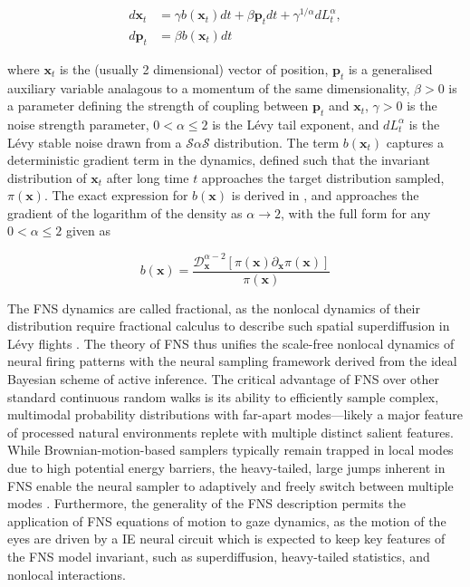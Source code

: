 \begin{equation}
\label{eq:fns}
\begin{aligned}
	d\textbf{x}_t &= \gamma b(\textbf{x}_t)dt + \beta \textbf{p}_t dt + \gamma^{1/\alpha} dL_t^{\alpha}, \\
	d\textbf{p}_t &= \beta b(\textbf{x}_t) dt
\end{aligned}
\end{equation}

where $\textbf{x}_t$ is the (usually 2 dimensional) vector of position, $\textbf{p}_t$ is a generalised auxiliary variable analagous to a momentum of the same dimensionality, $\beta > 0$ is a parameter defining the strength of coupling between $\textbf{p}_t$ and $\textbf{x}_t$, $\gamma > 0$ is the noise strength parameter, $ 0 < \alpha \leq 2$ is the Lévy tail exponent, and $dL_t^{\alpha}$ is the Lévy stable noise drawn from a $\mathcal{S}\alpha\mathcal{S}$ distribution. The term $b(\textbf{x}_t)$ captures a deterministic gradient term in the dynamics, defined such that the invariant distribution of $\textbf{x}_t$ after long time $t$ approaches the target distribution sampled, $\pi(\textbf{x})$. The exact expression for $b(\textbf{x})$ is derived in \cite{qi_fractional_2022}, and approaches the gradient of the logarithm of the density as $\alpha \rightarrow 2$, with the full form for any $ 0 < \alpha \leq 2$ given as

\begin{equation}
	b(\textbf{x}) = \frac{\mathcal{D}^{\alpha - 2}_{\textbf{x}}[\pi(\textbf{x}) \partial_{\textbf{x}} \pi(\textbf{x})]}{\pi(\textbf{x})}
\end{equation}

The FNS dynamics are called fractional, as the nonlocal dynamics of their distribution require fractional calculus to describe such spatial superdiffusion in Lévy flights \cite{tarasov_general_2021}. The theory of FNS thus unifies the scale-free nonlocal dynamics of neural firing patterns with the neural sampling framework derived from the ideal Bayesian scheme of active inference. The critical advantage of FNS over other standard continuous random walks is its ability to efficiently sample complex, multimodal probability distributions with far-apart modes—likely a major feature of processed natural environments replete with multiple distinct salient features. While Brownian-motion-based samplers typically remain trapped in local modes due to high potential energy barriers, the heavy-tailed, large jumps inherent in FNS enable the neural sampler to adaptively and freely switch between multiple modes \cite{neal_sampling_1996, latuszynski_mcmc_2025, simsekli_fractional_nodate, metzler_random_2000}. Furthermore, the generality of the FNS description permits the application of FNS equations of motion to gaze dynamics, as the motion of the eyes are driven by a IE neural circuit which is expected to keep key features of the FNS model invariant, such as superdiffusion, heavy-tailed statistics, and nonlocal interactions.

